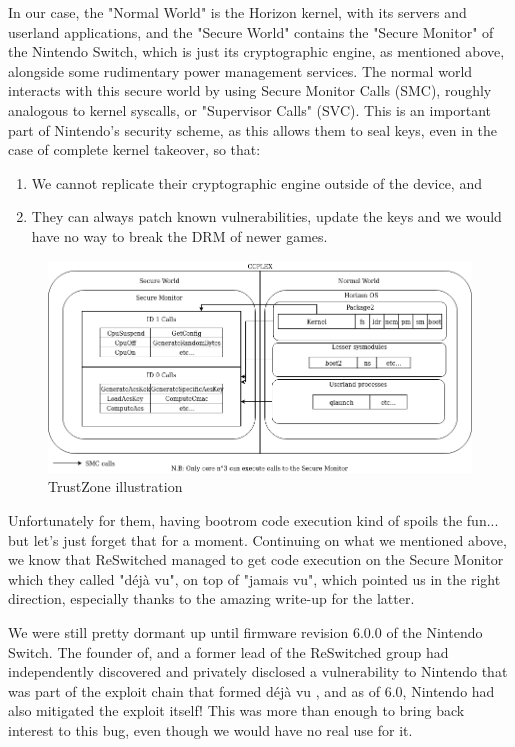 \documentclass[journal]{IEEEtran}
\begin{document}
In our case, the "Normal World" is the Horizon kernel, with its servers and userland applications,
and the "Secure World" contains the "Secure Monitor" of the Nintendo Switch, which is just its
cryptographic engine, as mentioned above, alongside some rudimentary power management services.
The normal world interacts with this secure world by using Secure Monitor Calls (SMC), roughly
analogous to kernel syscalls, or "Supervisor Calls" (SVC). This is an important part of Nintendo's
security scheme, as this allows them to seal keys, even in the case of complete kernel takeover,
so that:
\begin{enumerate}
   \item We cannot replicate their cryptographic engine outside of the device, and
   \item They can always patch known vulnerabilities, update the keys and we would
have no way to break the DRM of newer games.
\end{enumerate}

\begin{figure}[ht]
  \includegraphics[width=\columnwidth]{trustzone}
    \caption{TrustZone illustration}
\end{figure}

Unfortunately for them, having bootrom code execution kind of spoils the fun... but let's just
forget that for a moment. Continuing on what we mentioned above, we know that ReSwitched managed
to get code execution on the Secure Monitor which they called "déjà vu", on top of "jamais vu",
which pointed us in the right direction, especially thanks to the amazing write-up for the latter.

We were still pretty dormant up until firmware revision 6.0.0 of the Nintendo Switch.
The founder of, and a former lead of the ReSwitched group had independently discovered and
privately disclosed a vulnerability to Nintendo that was part of the exploit chain that formed
déjà vu \cite{nvhax}, and as of 6.0, Nintendo had also mitigated the exploit itself! \cite{6.0}
This was more than enough to bring back interest to this bug, even though we would have no real
use for it.
\end{document}

